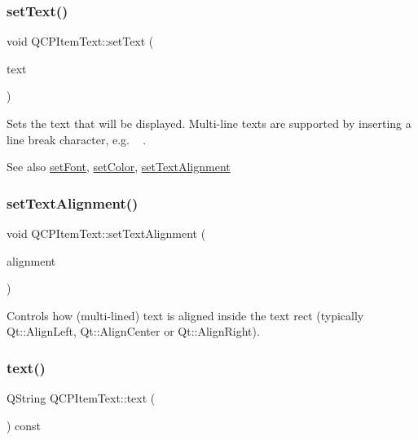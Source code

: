 \subsubsection{\texorpdfstring{setText()}{setText()}}
{\footnotesize\ttfamily void Q\+C\+P\+Item\+Text\+::set\+Text (\begin{DoxyParamCaption}\item[{const Q\+String \&}]{text }\end{DoxyParamCaption})}

Sets the text that will be displayed. Multi-\/line texts are supported by inserting a line break character, e.\+g. \textquotesingle{}~\newline
\textquotesingle{}.

\begin{DoxySeeAlso}{See also}
\mbox{\hyperlink{class_q_c_p_item_text_a94ad60ebe04f5c07c35e7c2029e96b1f}{set\+Font}}, \mbox{\hyperlink{class_q_c_p_item_text_aa51efc0841fe52da9eaf8aff6fc8a8b2}{set\+Color}}, \mbox{\hyperlink{class_q_c_p_item_text_ab5bc0684c4d1bed81949a11b34dba478}{set\+Text\+Alignment}} 
\end{DoxySeeAlso}
\mbox{\label{class_q_c_p_item_text_ab5bc0684c4d1bed81949a11b34dba478}} 
\subsubsection{\texorpdfstring{setTextAlignment()}{setTextAlignment()}}
{\footnotesize\ttfamily void Q\+C\+P\+Item\+Text\+::set\+Text\+Alignment (\begin{DoxyParamCaption}\item[{Qt\+::\+Alignment}]{alignment }\end{DoxyParamCaption})}

Controls how (multi-\/lined) text is aligned inside the text rect (typically Qt\+::\+Align\+Left, Qt\+::\+Align\+Center or Qt\+::\+Align\+Right). \mbox{\label{class_q_c_p_item_text_ad71c9e83ee3556d9d617eca854e8eb18}} 
\subsubsection{\texorpdfstring{text()}{text()}}
{\footnotesize\ttfamily Q\+String Q\+C\+P\+Item\+Text\+::text (\begin{DoxyParamCaption}{ }\end{DoxyParamCaption}) const\hspace{0.3cm}{\ttfamily [inline]}}

